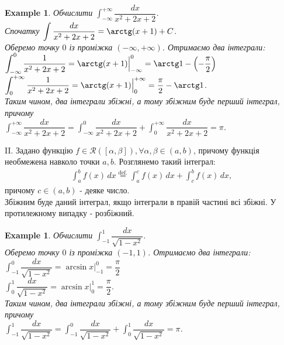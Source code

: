 \documentclass[a4paper, 10pt]{article}
\theoremstyle{theoremdd}
\theoremstyle{theoremdd}
\theoremstyle{theoremdd}
\theoremstyle{theoremdd}
\theoremstyle{theoremdd}
\newtheorem{example}[theorem]{Example}
\theoremstyle{theoremdd}
\theoremstyle{theoremdd}
\theoremstyle{theoremdd}
\theoremstyle{theoremdd}
\begin{document}
\begin{example}
Обчислити $\displaystyle\int_{-\infty}^{+\infty} \dfrac{dx}{x^2+2x+2}$.\\
Спочатку $\displaystyle\int \dfrac{dx}{x^2+2x+2} = \arctg (x+1) + C$.\\
Оберемо точку $0$ із проміжка $(-\infty,+\infty)$. Отримаємо два інтеграли:\\
$\displaystyle\int_{-\infty}^0 \dfrac{1}{x^2+2x+2} = \arctg(x+1) \Big|_{-\infty}^0 = \arctg 1 - \left( - \dfrac{\pi}{2} \right)$\\
$\displaystyle\int_0^{+\infty} \dfrac{1}{x^2+2x+2} = \arctg(x+1) \Big|_0^{+\infty} = \dfrac{\pi}{2} - \arctg 1$.\\
Таким чином, два інтеграли збіжні, а тому збіжним буде перший інтеграл, причому\\
$\displaystyle\int_{-\infty}^{+\infty} \dfrac{dx}{x^2+2x+2} = \int_{-\infty}^{0} \dfrac{dx}{x^2+2x+2} + \int_{0}^{+\infty} \dfrac{dx}{x^2+2x+2} = \pi$.
\end{example}

II. Задано функцію $f \in \mathcal{R}([\alpha,\beta]), \forall \alpha,\beta \in (a,b)$, причому функція необмежена навколо точки $a,b$. Розглянемо такий інтеграл:
\begin{align*}
\int_a^b f(x)\,dx \overset{\text{def.}}{=} \int_a^c f(x)\,dx + \int_c^b f(x)\,dx,
\end{align*}
причому $c \in (a,b)$ - деяке число.\\
Збіжним буде даний інтеграл, якщо інтеграли в правій частині всі збіжні. У протилежному випадку - розбіжний.

\begin{example}
Обчислити $\displaystyle\int_{-1}^1 \dfrac{dx}{\sqrt{1-x^2}}$.\\
Оберемо точку $0$ із проміжка $(-1,1)$. Отримаємо два інтеграли:\\
$\displaystyle\int_{-1}^0 \dfrac{dx}{\sqrt{1-x^2}} = \arcsin x \Big|_{-1}^0 = \dfrac{\pi}{2}$\\
$\displaystyle\int_0^1 \dfrac{dx}{\sqrt{1-x^2}} = \arcsin x \Big|_0^1 = \dfrac{\pi}{2}$.\\
Таким чином, два інтеграли збіжні, а тому збіжним буде перший інтеграл, причому\\
$\displaystyle\int_{-1}^1 \dfrac{dx}{\sqrt{1-x^2}} = \int_{-1}^0 \dfrac{dx}{\sqrt{1-x^2}} + \int_{0}^1 \dfrac{dx}{\sqrt{1-x^2}} = \pi$.
\end{example}
\end{document}

